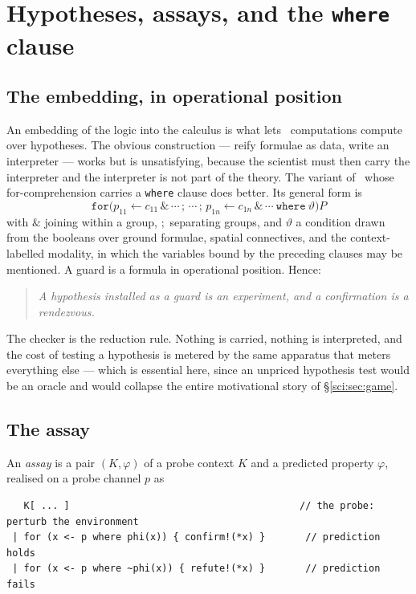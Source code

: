 \section{Hypotheses, assays, and the \texttt{where} clause}\label{sci:S4}
\label{sci:sec:assay}

\subsection{The embedding, in operational position}\label{sci:S4.1}

An embedding of the logic into the calculus is what lets \rhoc\ computations compute over hypotheses.
The obvious construction --- reify formulae as data, write an interpreter --- works but is
unsatisfying, because the scientist must then carry the interpreter and the interpreter is not part of
the theory. The variant of \rhoc\ whose for-comprehension carries a \texttt{where} clause
\cite[\S9]{Omnibus} does better. Its general form is
\[
\texttt{for}\big( p_{11} \leftarrow c_{11} \,\&\, \cdots \,;\, \cdots \,;\, p_{1n} \leftarrow c_{1n}
\,\&\, \cdots \ \texttt{where}\ \vartheta \big) P
\]
with $\&$ joining within a group, $;$ separating groups, and $\vartheta$ a condition drawn from the
booleans over ground formulae, spatial connectives, and the context-labelled modality, in which the
variables bound by the preceding clauses may be mentioned. A guard is a formula in operational
position. Hence:

\begin{quote}
\itshape A hypothesis installed as a guard is an experiment, and a confirmation is a rendezvous.
\end{quote}

The checker is the reduction rule. Nothing is carried, nothing is interpreted, and the cost of testing
a hypothesis is metered by the same apparatus that meters everything else --- which is essential here,
since an unpriced hypothesis test would be an oracle and would collapse the entire motivational story
of \S\ref{sci:sec:game}.

\subsection{The assay}\label{sci:S4.2}

\begin{definition}[Assay]
\label{sci:def:assay}
An \emph{assay} is a pair $(K, \varphi)$ of a probe context $K$ and a predicted property $\varphi$,
realised on a probe channel $p$ as
\begin{lstlisting}
   K[ ... ]                                        // the probe: perturb the environment
 | for (x <- p where phi(x)) { confirm!(*x) }       // prediction holds
 | for (x <- p where ~phi(x)) { refute!(*x) }       // prediction fails
\end{lstlisting}
\end{definition}


